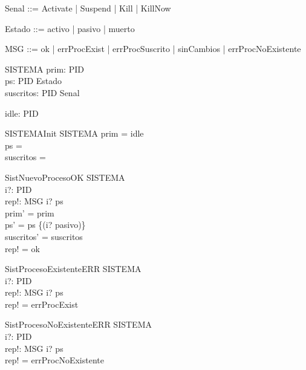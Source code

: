 \begin{zed}
  [PID]
\end{zed}

\begin{zed}
Senal ::= Activate | Suspend | Kill | KillNow
\end{zed}

\begin{zed}
Estado ::= activo | pasivo | muerto
\end{zed}

\begin{zed}
MSG ::= ok | errProcExist | errProcSuscrito | sinCambios | errProcNoExistente
\end{zed}

\begin{schema}{SISTEMA}
  prim: PID\\
  ps: PID \pfun  Estado\\
  suscritos: PID \rel  Senal
\end{schema}

\begin{axdef}
  idle: PID
\end{axdef}

\begin{schema}{SISTEMAInit}
  SISTEMA
\where
  prim = idle\\
  ps = \emptyset\\
  suscritos = \emptyset
\end{schema}

\begin{schema}{SistNuevoProcesoOK}
  \Delta SISTEMA\\
  i?: PID\\
  rep!: MSG
\where
  i? \notin  \dom  ps\\
  prim' = prim\\
  ps' = ps \cup  \{(i? \mapsto  pasivo)\}\\
  suscritos' = suscritos\\
  rep! = ok
\end{schema}

\begin{schema}{SistProcesoExistenteERR}
  \Xi SISTEMA\\
  i?: PID\\
  rep!: MSG
\where
  i? \in  \dom  ps\\
  rep! = errProcExist
\end{schema}

\begin{schema}{SistProcesoNoExistenteERR}
  \Xi SISTEMA\\
  i?: PID\\
  rep!: MSG
\where
  i? \notin  \dom  ps\\
  rep! = errProcNoExistente
\end{schema}

